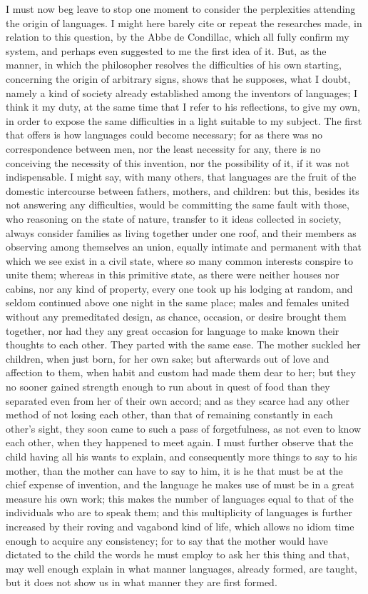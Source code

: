 \documentclass[11pt,twocolumn]{ltugboat}
\begin{document}
I must now beg leave to stop one moment to consider the perplexities
attending the origin of languages. I might here barely cite or repeat
the researches made, in relation to this question, by the Abbe de
Condillac, which all fully confirm my system, and perhaps even
suggested to me the first idea of it. But, as the manner, in which the
philosopher resolves the difficulties of his own starting, concerning
the origin of arbitrary signs, shows that he supposes, what I doubt,
namely a kind of society already established among the inventors of
languages; I think it my duty, at the same time that I refer to his
reflections, to give my own, in order to expose the same difficulties
in a light suitable to my subject. The first that offers is how
languages could become necessary; for as there was no correspondence
between men, nor the least necessity for any, there is no conceiving
the necessity of this invention, nor the possibility of it, if it was
not indispensable. I might say, with many others, that languages are
the fruit of the domestic intercourse between fathers, mothers, and
children: but this, besides its not answering any difficulties, would
be committing the same fault with those, who reasoning on the state of
nature, transfer to it ideas collected in society, always consider
families as living together under one roof, and their members as
observing among themselves an union, equally intimate and permanent
with that which we see exist in a civil state, where so many common
interests conspire to unite them; whereas in this primitive state, as
there were neither houses nor cabins, nor any kind of property, every
one took up his lodging at random, and seldom continued above one
night in the same place; males and females united without any
premeditated design, as chance, occasion, or desire brought them
together, nor had they any great occasion for language to make known
their thoughts to each other. They parted with the same ease. The
mother suckled her children, when just born, for her own sake; but
afterwards out of love and affection to them, when habit and custom
had made them dear to her; but they no sooner gained strength enough
to run about in quest of food than they separated even from her of
their own accord; and as they scarce had any other method of not
losing each other, than that of remaining constantly in each other's
sight, they soon came to such a pass of forgetfulness, as not even to
know each other, when they happened to meet again. I must further
observe that the child having all his wants to explain, and
consequently more things to say to his mother, than the mother can
have to say to him, it is he that must be at the chief expense of
invention, and the language he makes use of must be in a great measure
his own work; this makes the number of languages equal to that of the
individuals who are to speak them; and this multiplicity of languages
is further increased by their roving and vagabond kind of life, which
allows no idiom time enough to acquire any consistency; for to say
that the mother would have dictated to the child the words he must
employ to ask her this thing and that, may well enough explain in what
manner languages, already formed, are taught, but it does not show us
in what manner they are first formed.
\end{document}
